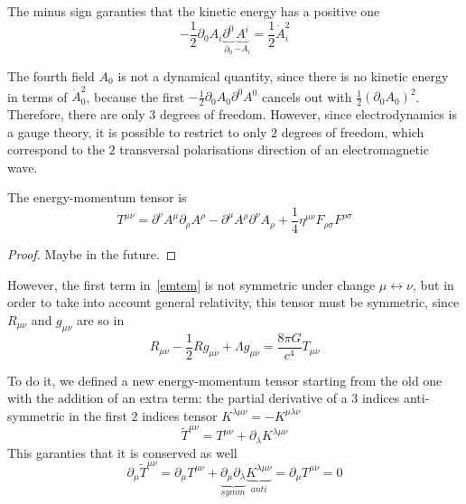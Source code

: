     The minus sign garanties that the kinetic energy has a positive one 
    \begin{equation*}
        - \frac{1}{2} \partial_0 A_i \underbrace{\partial^0}_{\partial_0} \underbrace{A^i}_{-A_i} = \frac{1}{2} \dot A_i^2
    \end{equation*}

    The fourth field $A_0$ is not a dynamical quantity, since there is no kinetic energy in terms of $\dot A_0^2$, because the first $- \frac{1}{2} \partial_0 A_0 \partial^0 A^0$ cancels out with $\frac{1}{2} (\partial_0 A_0)^2$. Therefore, there are only $3$ degrees of freedom. However, since electrodynamics is a gauge theory, it is possible to restrict to only $2$ degrees of freedom, which correspond to the $2$ transversal polarisations direction of an electromagnetic wave.

    The energy-momentum tensor is 
    \begin{equation}\label{emtem}
        T^{\mu\nu} = \partial^\nu A^\mu \partial_\rho A^\rho - \partial^\mu A^\rho \partial^\nu A_\rho + \frac{1}{4} \eta^{\mu\nu} F_{\rho \sigma} F^{\rho\sigma}
    \end{equation}

    \begin{proof}
        Maybe in the future.
    \end{proof}

    However, the first term in~\eqref{emtem} is not symmetric under change $\mu \leftrightarrow \nu$, but in order to take into account general relativity, this tensor must be symmetric, since $R_{\mu\nu}$ and $g_{\mu\nu}$ are so in
    \begin{equation*}
        R_{\mu\nu} - \frac{1}{2} R g_{\mu\nu} + \Lambda g_{\mu\nu} = \frac{8 \pi G}{c^4} T_{\mu\nu}
    \end{equation*}

    To do it, we defined a new energy-momentum tensor starting from the old one with the addition of an extra term: the partial derivative of a $3$ indices anti-symmetric in the first $2$ indices tensor $K^{\lambda\mu\nu} = - K^{\mu\lambda\nu}$
    \begin{equation*}
        \tilde T^{\mu\nu} = T^{\mu\nu} + \partial_\lambda K^{\lambda\mu\nu}
    \end{equation*} 
    This garanties that it is conserved as well 
    \begin{equation*}
        \partial_\mu \tilde T^{\mu\nu} = \partial_\mu T^{\mu\nu} + \underbrace{\partial_\mu \partial_\lambda}_{symm} \underbrace{K^{\lambda\mu\nu}}_{anti} = \partial_\mu T^{\mu\nu} = 0
    \end{equation*}

